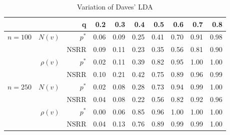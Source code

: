 \documentclass{article}
\begin{document}

\begin{table}[ht]
\begin{center}
\begin{tabular}{|r|r|r|rrrrrrr|}
  \hline
& & q & 0.2 & 0.3 & 0.4 & 0.5 & 0.6 & 0.7 & 0.8 \\ 
  \hline
\multirow{4}{*}{$n = 100$} & \multirow{2}{*}{$N(v)$} & $p^{*}$ & 0.06 & 0.09 & 0.25 & 0.41 & 0.70 & 0.91 & 0.98 \\ 
  & & NSRR & 0.09 & 0.11 & 0.23 & 0.35 & 0.56 & 0.81 & 0.90 \\
  \cline{2-10} 
  & \multirow{2}{*}{$\rho(v)$} & $p^{*}$ & 0.02 & 0.11 & 0.39 & 0.82 & 0.95 & 1.00 & 1.00 \\ 
  & & NSRR & 0.10 & 0.21 & 0.42 & 0.75 & 0.89 & 0.96 & 0.99 \\ \hline
  \multirow{4}{*}{$n = 250$} & \multirow{2}{*}{$N(v)$} & $p^{*}$ & 0.02 & 0.08 & 0.28 & 0.73 & 0.94 & 0.99 & 1.00 \\ 
  & & NSRR & 0.04 & 0.08 & 0.22 & 0.56 & 0.82 & 0.92 & 0.96 \\ \cline{2-10}
  & \multirow{2}{*}{$\rho(v)$} & $p^{*}$ & 0.00 & 0.06 & 0.85 & 0.96 & 1.00 & 1.00 & 1.00 \\ 
  & & NSRR & 0.04 & 0.13 & 0.76 & 0.89 & 0.99 & 0.99 & 1.00 \\ 
   \hline
\end{tabular}
\caption{Variation of Daves' LDA}
\end{center}
\end{table}
\end{document}
